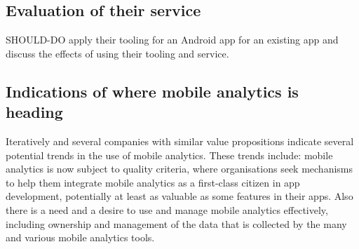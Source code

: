 \subsection{Evaluation of their service}
SHOULD-DO apply their tooling for an Android app for an existing app and discuss the effects of using their tooling and service. %

\subsection{Indications of where mobile analytics is heading}
Iteratively and several companies with similar value propositions indicate several potential trends in the use of mobile analytics. These trends include: mobile analytics is now subject to quality criteria, where organisations seek mechanisms to help them integrate mobile analytics as a first-class citizen in app development, potentially at least as valuable as some features in their apps. Also there is a need and a desire to use and manage mobile analytics effectively, including ownership and management of the data that is collected by the many and various mobile analytics tools. 

